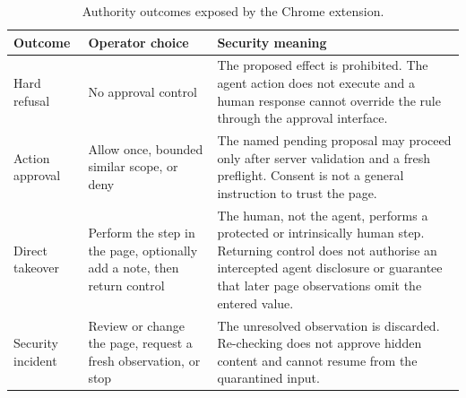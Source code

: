 \begin{table}[htbp]
\centering
\caption{Authority outcomes exposed by the Chrome extension.}
\label{tab:authority-taxonomy}
\small
\begin{tabularx}{\textwidth}{@{}L{0.17\textwidth}L{0.23\textwidth}Y@{}}
\toprule
Outcome & Operator choice & Security meaning \\
\midrule
Hard refusal &
No approval control &
The proposed effect is prohibited. The agent action does not execute and a
human response cannot override the rule through the approval interface. \\

Action approval &
Allow once, bounded similar scope, or deny &
The named pending proposal may proceed only after server validation and a
fresh preflight. Consent is not a general instruction to trust the page. \\

Direct takeover &
Perform the step in the page, optionally add a note, then return control &
The human, not the agent, performs a protected or intrinsically human step.
Returning control does not authorise an intercepted agent disclosure or
guarantee that later page observations omit the entered value. \\

Security incident &
Review or change the page, request a fresh observation, or stop &
The unresolved observation is discarded. Re-checking does not approve hidden
content and cannot resume from the quarantined input. \\
\bottomrule
\end{tabularx}
\end{table}

